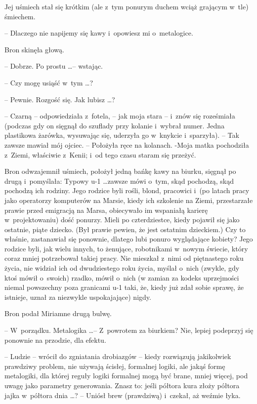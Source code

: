 \documentclass[oneside,polish,11pt,rmheadings]{mwbk}
\begin{document}
Jej uśmiech stał się krótkim (ale z~tym ponurym duchem wciąż grającym w~tle) śmiechem. 

-- Dlaczego nie napijemy się kawy i~opowiesz mi o~metalogice. 

Bron skinęła głową. 

-- Dobrze. Po prostu \ldots  -- wstając. 

-- Czy mogę usiąść w~tym \ldots ? 

-- Pewnie. Rozgość się. Jak lubisz  \ldots ? 

-- Czarną -- odpowiedziała z~fotela, -- jak moja stara -- i~znów się roześmiała (podczas gdy on sięgnął do szuflady przy kolanie i~wybrał numer. Jedna plastikowa żarówka, wysuwając się, uderzyła go w~knykcie i~sparzyła). -- Tak zawsze mawiał mój ojciec. -- Położyła ręce na kolanach. -Moja matka pochodziła z~Ziemi, właściwie z~Kenii; i~od tego czasu staram się przeżyć. 

Bron odwzajemnił uśmiech, położył jedną bańkę kawy na biurku, sięgnął po drugą i~pomyślała: Typowy u-1 \ldots  zawsze mówi o~tym, skąd pochodzą, skąd pochodzą ich rodziny. Jego rodzice byli rośli, blond, pracowici i~(po latach pracy jako operatorzy komputerów na Marsie, kiedy ich szkolenie na Ziemi, przestarzałe prawie przed emigracją na Marsa, obiecywało im wspaniałą karierę w~projektowaniu) dość ponurzy. Mieli po czterdziestce, kiedy pojawił się jako ostatnie, piąte dziecko. (Był prawie pewien, że jest ostatnim dzieckiem.) Czy to właśnie, zastanawiał się ponownie, dlatego lubi ponuro wyglądające kobiety? Jego rodzice byli, jak wielu innych, to żenujące, robotnikami w~nowym świecie, który coraz mniej potrzebował takiej pracy. Nie mieszkał z~nimi od piętnastego roku życia, nie widział ich od dwudziestego roku życia, myślał o~nich (zwykle, gdy ktoś mówił o~swoich) rzadko, mówił o~nich (w zamian za kodeks uprzejmości niemal powszechny poza granicami u-1 taki, że, kiedy już zdał sobie sprawę, że istnieje, uznał za niezwykle uspokajające) nigdy. 

Bron podał Miriamne drugą bulwę. 

-- W~porządku. Metalogika \ldots  -- Z~powrotem za biurkiem? Nie, lepiej podeprzyj się ponownie na przodzie, dla efektu. 

-- Ludzie -- wrócił do zgniatania drobiazgów -- kiedy rozwiązują jakikolwiek prawdziwy problem, nie używają ścisłej, formalnej logiki, ale jakąś formę metalogiki, dla której reguły logiki formalnej mogą być brane, mniej więcej, pod uwagę jako parametry generowania. Znasz to: jeśli półtora kura złoży półtora jajka w~półtora dnia \ldots ? -- Uniósł brew (prawdziwą) i~czekał, aż weźmie łyka. 
\end{document}
